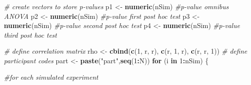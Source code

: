 \documentclass[
]{book}
\newenvironment{Shaded}{\begin{snugshade}}{\end{snugshade}}
\newcommand{\CommentTok}[1]{\textcolor[rgb]{0.56,0.35,0.01}{\textit{#1}}}
\newcommand{\ControlFlowTok}[1]{\textcolor[rgb]{0.13,0.29,0.53}{\textbf{#1}}}
\newcommand{\DecValTok}[1]{\textcolor[rgb]{0.00,0.00,0.81}{#1}}
\newcommand{\KeywordTok}[1]{\textcolor[rgb]{0.13,0.29,0.53}{\textbf{#1}}}
\newcommand{\NormalTok}[1]{#1}
\newcommand{\OperatorTok}[1]{\textcolor[rgb]{0.81,0.36,0.00}{\textbf{#1}}}
\newcommand{\StringTok}[1]{\textcolor[rgb]{0.31,0.60,0.02}{#1}}
\begin{document}
\begin{Shaded}
\begin{Highlighting}[]
\CommentTok{# create vectors to store p-values}
\NormalTok{p1 <-}\StringTok{ }\KeywordTok{numeric}\NormalTok{(nSim) }\CommentTok{#p-value omnibus ANOVA}
\NormalTok{p2 <-}\StringTok{ }\KeywordTok{numeric}\NormalTok{(nSim) }\CommentTok{#p-value first post hoc test}
\NormalTok{p3 <-}\StringTok{ }\KeywordTok{numeric}\NormalTok{(nSim) }\CommentTok{#p-value second post hoc test}
\NormalTok{p4 <-}\StringTok{ }\KeywordTok{numeric}\NormalTok{(nSim) }\CommentTok{#p-value third post hoc test}

\CommentTok{# define correlation matrix}
\NormalTok{rho <-}\StringTok{ }\KeywordTok{cbind}\NormalTok{(}\KeywordTok{c}\NormalTok{(}\DecValTok{1}\NormalTok{, r, r), }\KeywordTok{c}\NormalTok{(r, }\DecValTok{1}\NormalTok{, r), }\KeywordTok{c}\NormalTok{(r, r, }\DecValTok{1}\NormalTok{))}
\CommentTok{# define participant codes}
\NormalTok{part <-}\StringTok{ }\KeywordTok{paste}\NormalTok{(}\StringTok{"part"}\NormalTok{,}\KeywordTok{seq}\NormalTok{(}\DecValTok{1}\OperatorTok{:}\NormalTok{N))}
\ControlFlowTok{for}\NormalTok{ (i }\ControlFlowTok{in} \DecValTok{1}\OperatorTok{:}\NormalTok{nSim) \{}
  
  \CommentTok{#for each simulated experiment}


\end{Highlighting}
\end{Shaded}
\end{document}
